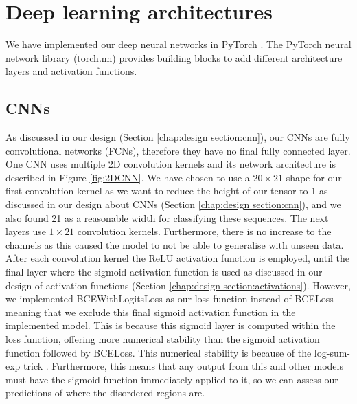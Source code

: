 \documentclass{l4proj}
\begin{document}
\section{Deep learning architectures}
\label{chap:implementation sec:architectures}

We have implemented our deep neural networks in PyTorch \citep{pytorch}. The PyTorch neural network library (torch.nn) provides building blocks to add different architecture layers and activation functions.

\subsection{CNNs}

As discussed in our design (Section \ref{chap:design section:cnn}), our CNNs are fully convolutional networks (FCNs), therefore they have no final fully connected layer. One CNN uses multiple 2D convolution kernels and its network architecture is described in Figure \ref{fig:2DCNN}. We have chosen to use a $20\times 21$ shape for our first convolution kernel as we want to reduce the height of our tensor to 1 as discussed in our design about CNNs (Section \ref{chap:design section:cnn}), and we also found 21 as a reasonable width for classifying these sequences. The next layers use $1\times 21$ convolution kernels. Furthermore, there is no increase to the channels as this caused the model to not be able to generalise with unseen data. After each convolution kernel the ReLU activation function is employed, until the final layer where the sigmoid activation function is used as discussed in our design of activation functions (Section \ref{chap:design section:activations}). However, we implemented BCEWithLogitsLoss as our loss function instead of BCELoss meaning that we exclude this final sigmoid activation function in the implemented model. This is because this sigmoid layer is computed within the loss function, offering more numerical stability than the sigmoid activation function followed by BCELoss. This numerical stability is because of the log-sum-exp trick \citep{Gundersen:20}. Furthermore, this means that any output from this and other models must have the sigmoid function immediately applied to it, so we can assess our predictions of where the disordered regions are.
\end{document}
